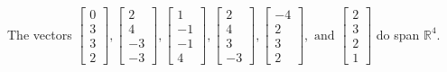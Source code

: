 \begin{exercise}
\begin{exerciseStatement}
  \end{exerciseStatement}
  \begin{exerciseAnswer}
   The vectors \(\left[\begin{array}{r}
0 \\
3 \\
3 \\
2
\end{array}\right] , \left[\begin{array}{r}
2 \\
4 \\
-3 \\
-3
\end{array}\right] , \left[\begin{array}{r}
1 \\
-1 \\
-1 \\
4
\end{array}\right] , \left[\begin{array}{r}
2 \\
4 \\
3 \\
-3
\end{array}\right] , \left[\begin{array}{r}
-4 \\
2 \\
3 \\
2
\end{array}\right] , \text{ and } \left[\begin{array}{r}
2 \\
3 \\
2 \\
1
\end{array}\right]\) 
  	 do  
	span \(\mathbb{R}^4\).
  


  \end{exerciseAnswer}
\end{exercise}